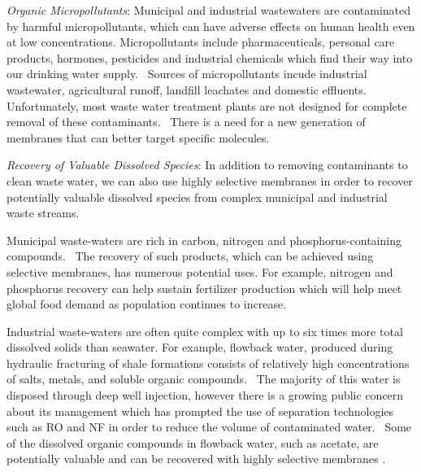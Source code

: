  \textit{Organic Micropollutants}: Municipal and industrial wastewaters are contaminated
  by harmful micropollutants, which can have adverse effects on human health even at low 
  concentrations.\cite{schwarzenbach_challenge_2006} Micropollutants include pharmaceuticals,
  personal care products, hormones, pesticides and industrial chemicals which find their way
  into our drinking water supply.~\cite{barbosa_occurrence_2016} Sources of micropollutants
  incude industrial wastewater, agricultural runoff, landfill leachates and domestic 
  effluents.~\cite{mompelat_occurrence_2009} Unfortunately, most waste water treatment 
  plants are not designed for complete removal of these contaminants.~\cite{tijani_review_2013}
  There is a need for a new generation of membranes that can better target specific molecules.
  
  \textit{Recovery of Valuable Dissolved Species}: In addition to removing contaminants 
  to clean waste water, we can also use highly selective membranes in order to recover
  potentially valuable dissolved species from complex municipal and industrial waste
  streams.~\cite{guest_new_2009,daigger_evolving_2009}
  
  Municipal waste-waters are rich in carbon, nitrogen and phosphorus-containing 
  compounds.~\cite{romero_raw_2013} The recovery of such products, which can be 
  achieved using selective membranes, has numerous potential uses.\cite{sales_resource_2015}
  For example, nitrogen and phosphorus recovery can help sustain fertilizer 
  production which will help meet global food demand as population continues
  to increase.\cite{xie_membrane-based_2016}

  Industrial waste-waters are often quite complex with up to six times more 
  total dissolved solids than seawater.\cite{werber_materials_2016} For example,
  flowback water, produced during hydraulic fracturing of shale formations consists
  of relatively high concentrations of salts, metals, and soluble organic 
  compounds.~\cite{orem_organic_2014} The majority of this water is disposed 
  through deep well injection, however there is a growing public concern about
  its management which has prompted the use of separation technologies such as 
  RO and NF in order to reduce the volume of contaminated water.~\cite{gregory_water_2011}
  Some of the dissolved organic compounds in flowback water, such as acetate, 
  are potentially valuable and can be recovered with highly selective membranes
  \cite{dischinger_application_2017}.

